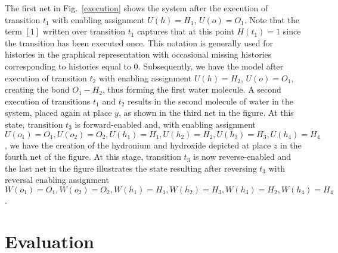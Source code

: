\documentclass[runningheads]{llncs}
\begin{document}
The first net in Fig.~\ref{execution}  shows the system after the execution of transition $t_1$ with enabling assignment $U(h)=H_1$, $U(o)=O_1$. Note
that the term $[1]$ written over transition $t_1$ captures that at this point $H(t_1)=1$ 
since the transition has been executed once.
This notation is generally used for histories in the graphical representation with occasional
missing histories corresponding to histories equal to $0$.
Subsequently,
we have the model after execution of transition $t_2$ with enabling assignment $U(h)=H_2$,
$U(o)=O_1$, creating the bond $O_1-H_2$, thus forming the first water molecule. A second
execution of transitions $t_1$ and $t_2$ results in the second molecule of water in the system,
placed again at place $y$, as shown in the third net in the figure. At this state, transition
$t_3$ is forward-enabled and,  with enabling assignment $U(o_1)=O_1, U(o_2)=O_2, U(h_1)=H_1, 
U(h_2)=H_2,U(h_3)=H_3,U(h_4)=H_4$, we have the creation of the hydronium and hydroxide
depicted at place $z$ in the fourth net of the figure. At this stage, transition $t_3$ is
now reverse-enabled and the last net in the figure illustrates the state resulting after
reversing $t_3$ with reversal enabling assignment $W(o_1)=O_1, W(o_2)=O_2, W(h_1)=H_1, 
W(h_2)=H_3,W(h_3)=H_2,W(h_4)=H_4$.


\section{Evaluation}
\label{sec:evaluation}
\end{document}
